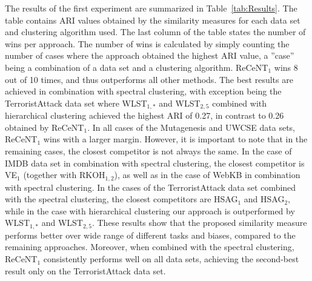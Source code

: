 The results of the first experiment are summarized in Table~\ref{tab:Results}.
The table contains ARI values obtained by the similarity measures for each data set and clustering algorithm used.
The last column of the table states the number of wins per approach.
The number of wins is calculated by simply counting the number of cases where the approach obtained the highest ARI value, a ''case'' being a combination of a data set and a clustering algorithm.
ReCeNT$_1$ wins 8 out of 10 times, and thus outperforms all other methods.
The best results are achieved in combination with spectral clustering, with exception being the TerroristAttack data set where WLST$_{1,*}$ and WLST$_{2,5}$ combined with hierarchical clustering achieved the highest ARI of 0.27, in contrast to 0.26 obtained by ReCeNT$_1$.
In all cases of the Mutagenesis and UWCSE data sets, ReCeNT$_1$ wins with a larger margin.
However, it is important to note that in the remaining cases, the closest competitor is not always the same.
In the case of IMDB data set in combination with spectral clustering, the closest competitor is VE$_1$ (together with RKOH$_{1,2}$), as well as in the case of WebKB in combination with spectral clustering.
In the cases of the TerroristAttack data set combined with the spectral clustering, the closest competitors are HSAG$_1$ and HSAG$_2$, while in the case with hierarchical clustering our approach is outperformed by WLST$_{1,*}$ and WLST$_{2,5}$.
These results show that the proposed similarity measure performs better over wide range of different tasks and biases, compared to the remaining approaches.
Moreover, when combined with the spectral clustering, ReCeNT$_1$ consistently performs well on all data sets, achieving the second-best result only on the TerroristAttack data set.
\vspace{2pt}


